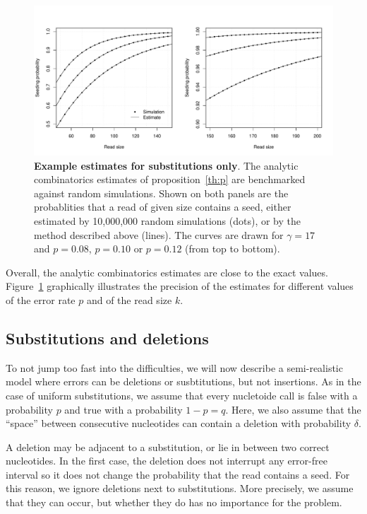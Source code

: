 \documentclass{article}
\begin{document}
\begin{figure}[h]
\centering
\includegraphics[scale=0.445]{simulp.pdf}
\caption{\textbf{Example estimates for substitutions only}. The analytic
combinatorics estimates of proposition~\ref{th:p} are benchmarked against
random simulations. Shown on both panels are the probablities that a read
of given size contains a seed, either estimated by 10,000,000 random
simulations (dots), or by the method described above (lines). The curves
are drawn for $\gamma=17$ and $p=0.08$, $p=0.10$ or $p=0.12$ (from top to
bottom).}
\label{fig:simulp}
\end{figure}

Overall, the analytic combinatorics estimates are close to the exact
values. Figure~\ref{fig:simulp} graphically illustrates the precision of
the estimates for different values of the error rate $p$ and of the read
size $k$.




\subsection{Substitutions and deletions}
\label{sec:deletions}

To not jump too fast into the difficulties, we will now describe a
semi-realistic model where errors can be deletions or susbtitutions, but
not insertions. As in the case of uniform substitutions, we assume that
every nucletoide call is false with a probability $p$ and true with a
probability $1-p=q$. Here, we also assume that the ``space''  between
consecutive nucleotides can contain a deletion with probability $\delta$.

A deletion may be adjacent to a substitution, or lie in between two
correct nucleotides. In the first case, the deletion does not interrupt
any error-free interval so it does not change the probability that the
read contains a seed. For this reason, we ignore deletions next to
substitutions. More precisely, we assume that they can occur, but whether
they do has no importance for the problem.
\end{document}
